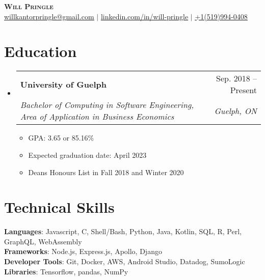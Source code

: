 \documentclass[letterpaper,11pt]{article}
\makeatletter
\newcommand{\resumeItem}[1]{
  \item\small{
    {#1 \vspace{-2pt}}
  }
}
\newcommand{\resumeSubheading}[4]{
  \vspace{-2pt}\item
    \begin{tabular*}{0.97\textwidth}[t]{l@{\extracolsep{\fill}}r}
      \textbf{#1} & #2 \\
      \textit{\small#3} & \textit{\small #4} \\
    \end{tabular*}\vspace{-7pt}
}
\newcommand{\resumeSubHeadingListStart}{\begin{itemize}[leftmargin=0.15in, label={}]}
\newcommand{\resumeSubHeadingListEnd}{\end{itemize}}
\newcommand{\resumeItemListStart}{\begin{itemize}}
\newcommand{\resumeItemListEnd}{\end{itemize}\vspace{-5pt}}
\makeatother
\begin{document}
\begin{center}
    \textbf{\Huge \scshape Will Pringle} \\ \vspace{1pt}
    \small \href{mailto:willkantorpringle@gmail.com}{\underline{willkantorpringle@gmail.com}} $|$ 
    \href{https://www.linkedin.com/in/will-pringle/}{\underline{linkedin.com/in/will-pringle}} $|$
    \href{tel:+15199940408}{\underline{+1(519)994-0408}}
\end{center}


\section{Education}
  \resumeSubHeadingListStart
    \resumeSubheading
      {University of Guelph}{Sep. 2018 -- Present}
      {Bachelor of Computing in Software Engineering, Area of Application in Business Economics}{Guelph, ON}
      \resumeItemListStart
        \resumeItem{GPA: 3.65 or 85.16\%}
        \resumeItem{Expected graduation date: April 2023}
        \resumeItem{Deans Honours List in Fall 2018 and Winter 2020}
      \resumeItemListEnd
  \resumeSubHeadingListEnd


\section{Technical Skills}
  \begin{itemize}[leftmargin=0.15in, label={}]
    \small{\item{
      \textbf{Languages}{: Javascript, C, Shell/Bash, Python, Java, Kotlin, SQL, R, Perl, GraphQL, WebAssembly} \\
      \textbf{Frameworks}{: Node.js, Express.js, Apollo, Django} \\
      \textbf{Developer Tools}{: Git, Docker, AWS, Android Studio, Datadog, SumoLogic} \\
      \textbf{Libraries}{: Tensorflow, pandas, NumPy} \\
    }}
  \end{itemize}


\end{document}
